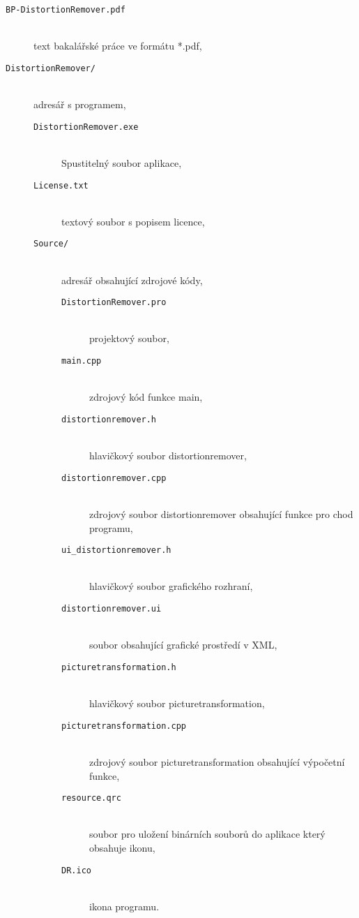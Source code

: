     \begin{description}
        \item[\tt BP-DistortionRemover.pdf] ~ \\ text bakalářské práce ve formátu *.pdf,
    	
        
        \item[\tt DistortionRemover/] ~ \\ adresář s programem,
        \begin{description}
        		
        		\item[\tt DistortionRemover.exe] ~ \\ Spustitelný soubor aplikace,
        		
        		\item[\tt License.txt] ~ \\ textový soubor s popisem licence,
        		
            	\item[\tt Source/] ~ \\ adresář obsahující zdrojové kódy,
            	\begin{description}
            			\item[\tt DistortionRemover.pro] ~ \\ projektový soubor,
            			\item[\tt main.cpp] ~ \\ zdrojový kód funkce main,
            			\item[\tt distortionremover.h] ~ \\ hlavičkový soubor distortionremover,
            			\item[\tt distortionremover.cpp] ~ \\ zdrojový soubor distortionremover obsahující funkce pro chod programu,
            			\item[\tt ui\_distortionremover.h] ~ \\ hlavičkový soubor grafického rozhraní,
            			\item[\tt distortionremover.ui] ~ \\ soubor obsahující grafické prostředí v XML,
            			\item[\tt picturetransformation.h] ~ \\ hlavičkový soubor picturetransformation,
            			\item[\tt picturetransformation.cpp] ~ \\ zdrojový soubor picturetransformation obsahující výpočetní funkce,
            			\item[\tt resource.qrc] ~ \\ soubor pro uložení binárních souborů do aplikace který obsahuje ikonu,
            			\item[\tt DR.ico] ~ \\ ikona programu.

            	\end{description}
        \end{description}
    \end{description}

